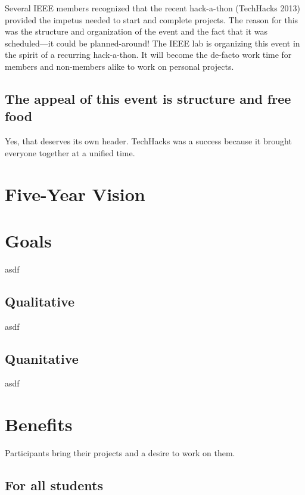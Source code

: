 \documentclass{article}
\begin{document}
Several IEEE members recognized that the recent hack-a-thon (TechHacks 2013)
provided the impetus needed to start and complete projects. The reason for this
was the structure and organization of the event and the fact that it was
scheduled---it could be planned-around! The IEEE lab is organizing this event in
the spirit of a recurring hack-a-thon. It will become the de-facto work time for
members and non-members alike to work on personal projects.


\subsection*{The appeal of this event is structure and free food}

Yes, that deserves its own header. TechHacks was a success because it brought
everyone together at a unified time.



\section{Five-Year Vision}



\section{Goals}

asdf


\subsection{Qualitative}

asdf


\subsection{Quanitative}

asdf



\section{Benefits}

Participants bring their projects and a desire to work on them.


\subsection{For all students}
\end{document}
